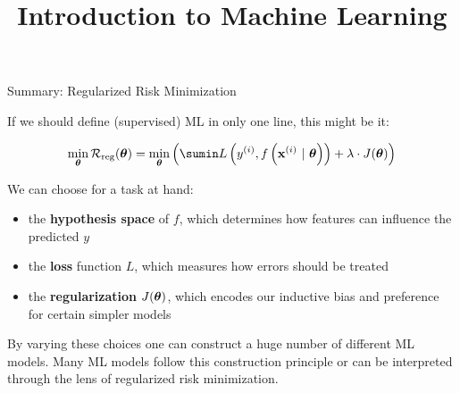\documentclass[11pt,compress,t,notes=noshow, xcolor=table]{beamer}
\title{Introduction to Machine Learning}
\begin{document}



\begin{vbframe}{Summary: Regularized Risk Minimization}

If we should define (supervised) ML in only one line, this might be it:

\[
\min_{\thetav} \riskrt= \min_{\thetav} \left(\sumin \Lxyit + \lambda \cdot J(\thetav) \right)
\]

We can choose for a task at hand:

\begin{itemize}
  \item the \textbf{hypothesis space} of $f$, which determines how features can 
  influence the predicted $y$
  \item the \textbf{loss} function $L$, which measures how errors should be treated
  \item the \textbf{regularization} $J(\bm{\theta})$, which encodes our inductive 
  bias and preference for certain simpler models
\end{itemize}

\vfill

By varying these choices one can construct a huge number of different ML models. 
Many ML models follow this construction principle or can be interpreted through 
the lens of regularized risk minimization.

\end{vbframe}
\end{document}
